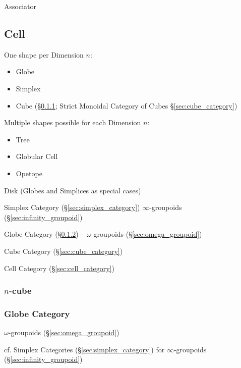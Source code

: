 Associator



\subsection{Cell}\label{sec:cell}

One shape per Dimension $n$:
\begin{itemize}
  \item Globe
  \item Simplex
  \item Cube (\S\ref{sec:cellular_n_cube}; \fist Strict Monoidal Category of
    Cubes \S\ref{sec:cube_category})
\end{itemize}

Multiple shapes possible for each Dimension $n$:
\begin{itemize}
  \item Tree
  \item Globular Cell
  \item Opetope
\end{itemize}

Disk (Globes and Simplices as special cases)

\fist Simplex Category (\S\ref{sec:simplex_category})
$\infty$-groupoids (\S\ref{sec:infinity_groupoid})

\fist Globe Category (\S\ref{sec:globe_category}) --
$\omega$-groupoids (\S\ref{sec:omega_groupoid})

\fist Cube Category (\S\ref{sec:cube_category})

\fist Cell Category (\S\ref{sec:cell_category})



\subsubsection{$n$-cube}\label{sec:cellular_n_cube}

\subsubsection{Globe Category}\label{sec:globe_category}


$\omega$-groupoids (\S\ref{sec:omega_groupoid})

\fist cf. Simplex Categories (\S\ref{sec:simplex_category}) for
$\infty$-groupoids (\S\ref{sec:infinity_groupoid})



